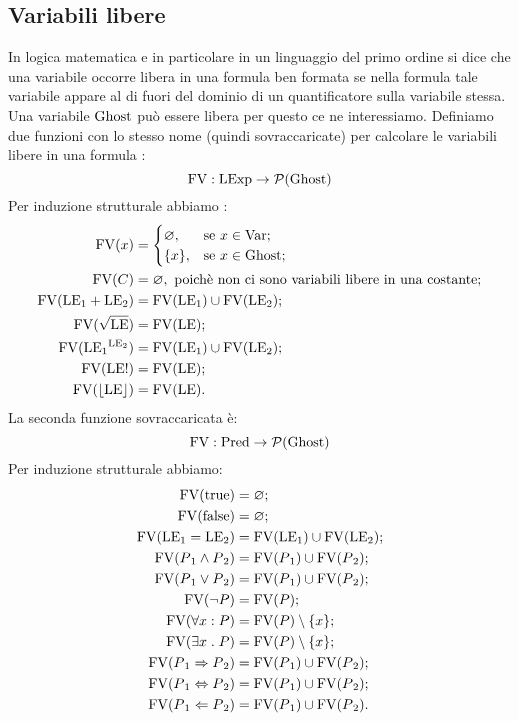\subsection{Variabili libere}
In logica matematica e in particolare in un linguaggio del primo ordine si dice che una variabile occorre libera in una formula ben formata se nella formula tale variabile appare al di fuori del dominio di un quantificatore sulla variabile stessa. Una variabile $\mathrm{Ghost}$ può essere libera per questo ce ne interessiamo.
Definiamo due funzioni con lo stesso nome (quindi sovraccaricate) per calcolare le variabili libere in una formula :
\[
   \mathrm{FV}\mathrel{:}\mathrm{LExp} \rightarrow \mathcal{P}(\mathrm{Ghost})
\]
Per induzione strutturale abbiamo :
\begin{align*}
   \mathrm{FV}(x) 
      &= 
        \begin{cases}
            \varnothing,&\text{se $x  \in \mathrm{Var}$};\\
            \{x\},    &\text{se $x  \in \mathrm{Ghost}$};
        \end{cases} \\
   \mathrm{FV}( C) 
      &= \varnothing,\text{ poichè non ci sono variabili libere in una costante};\\
   \mathrm{FV}(\mathrm{LE}{_1} + \mathrm{LE}{_2}) 
      &= \mathrm{FV}(\mathrm{LE}{_1}) \cup \mathrm{FV}(\mathrm{LE}{_2});\\
   \mathrm{FV}(\sqrt{\mathrm{LE}}) 
      &= \mathrm{FV}(\mathrm{LE});\\
   \mathrm{FV}(\mathrm{LE}{_1}^{\mathrm{LE}_2}) 
      &= \mathrm{FV}(\mathrm{LE}{_1}) \cup \mathrm{FV}(\mathrm{LE}_2);\\
   \mathrm{FV}(\mathrm{LE}!) 
      &= \mathrm{FV}(\mathrm{LE});\\
   \mathrm{FV}(\lfloor \mathrm{LE} \rfloor) 
      &= \mathrm{FV}(\mathrm{LE}).
\end{align*}
La seconda funzione sovraccaricata è:
\[
\mathrm{FV}\mathrel{:}\mathrm{Pred}\rightarrow\mathcal{P}(\mathrm{Ghost})
\]
Per induzione strutturale abbiamo:
\begin{align*}
   \mathrm{FV}(\mathrm{true}) 
      &= \varnothing;\\
   \mathrm{FV}(\mathrm{false}) 
      &= \varnothing;\\
   \mathrm{FV}(\mathrm{LE}{_1} = \mathrm{LE}{_2}) 
      &= \mathrm{FV}(\mathrm{LE}{_1}) \cup \mathrm{FV}(\mathrm{LE}{_2});\\
   \mathrm{FV}(P{_1} \wedge P{_2}) 
      &= \mathrm{FV}(P{_1}) \cup \mathrm{FV}(P{_2});\\
   \mathrm{FV}(P{_1} \vee P{_2}) 
      &= \mathrm{FV}(P{_1}) \cup \mathrm{FV}(P{_2});\\
   \mathrm{FV}(\neg P) 
      &= \mathrm{FV}(P);\\
   \mathrm{FV}(\forall x \mathrel{:} P) 
      &= \mathrm{FV}(P)\setminus \{x\};\\
   \mathrm{FV}(\exists x \mathrel{.} P) 
      &= \mathrm{FV}(P)\setminus \{x\};\\
   \mathrm{FV}(P{_1} \Rightarrow P{_2}) 
      &= \mathrm{FV}(P{_1}) \cup \mathrm{FV}(P{_2});\\
   \mathrm{FV}(P{_1} \Leftrightarrow P{_2}) 
      &= \mathrm{FV}(P{_1}) \cup \mathrm{FV}(P{_2});\\
   \mathrm{FV}(P{_1} \Leftarrow P{_2}) 
      &= \mathrm{FV}(P{_1}) \cup \mathrm{FV}(P{_2}).
\end{align*}
